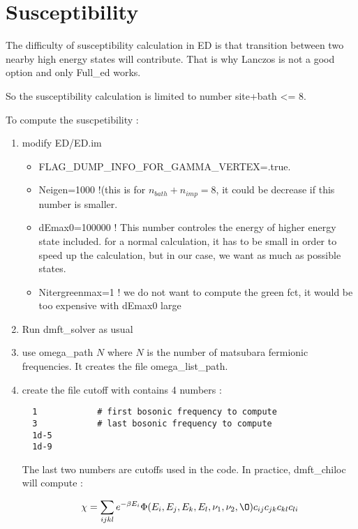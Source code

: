 \documentclass{book}
\def\b{\beta}
\def\v{\nu}
\begin{document}
\section{Susceptibility}


The difficulty of susceptibility calculation in ED is that transition between two nearby high energy states  will contribute. That is why Lanczos is not a good option and only Full\_ed works.

So the susceptibility calculation is limited to number site+bath <= 8.

To compute the suscpetibility :

\begin{enumerate}
\item modify ED/ED.im
  \begin{itemize}
  \item FLAG\_DUMP\_INFO\_FOR\_GAMMA\_VERTEX=.true.
  \item Neigen=1000 !(this is for $n_{bath}+n_{imp} = 8$, it could be decrease if this number is smaller.
  \item dEmax0=100000 !  This number controles the energy of higher energy state included. for a normal calculation, it has to be small in order to speed up the calculation, but in our case, we want as much as possible states.
  \item  Nitergreenmax=1 ! we do not want to compute the green fct, it would be too expensive with  dEmax0 large
  \end{itemize}

\item Run dmft\_solver as usual

\item use omega\_path $N$ where $N$ is the number of matsubara fermionic frequencies. It creates the file omega\_list\_path.

\item create the file cutoff with contains 4 numbers :

\begin{lstlisting}
  1            # first bosonic frequency to compute
  3            # last bosonic frequency to compute
  1d-5
  1d-9
\end{lstlisting}
The last two numbers are cutoffs used in the code.
In practice, dmft\_chiloc will  compute  :

\begin{equation}
  \chi = \sum_{ijkl} e^{-\b E_i} \Phi(E_i,E_j,E_k,E_l,\v_1,\v_2,\O) c_{ij}c_{jk}c_{kl}c_{li}
\end{equation}


\end{enumerate}
\end{document}
